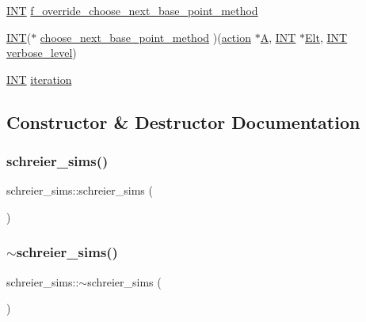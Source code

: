 \begin{DoxyCompactItemize}
\item 
\mbox{\hyperlink{galois_8h_a09fddde158a3a20bd2dcadb609de11dc}{I\+NT}} \mbox{\hyperlink{classschreier__sims_a0c07ea14a339d0349749522580786cc8}{f\+\_\+override\+\_\+choose\+\_\+next\+\_\+base\+\_\+point\+\_\+method}}
\item 
\mbox{\hyperlink{galois_8h_a09fddde158a3a20bd2dcadb609de11dc}{I\+NT}}($\ast$ \mbox{\hyperlink{classschreier__sims_a8639b48a416a69dc88c6a1d89aafdc26}{choose\+\_\+next\+\_\+base\+\_\+point\+\_\+method}} )(\mbox{\hyperlink{classaction}{action}} $\ast$\mbox{\hyperlink{simeon_8_c_a97833f04c3a9c008df5521a2fc291bb4}{A}}, \mbox{\hyperlink{galois_8h_a09fddde158a3a20bd2dcadb609de11dc}{I\+NT}} $\ast$\mbox{\hyperlink{simeon_8_c_aec1406935bdb1fee3561fcb840964100}{Elt}}, \mbox{\hyperlink{galois_8h_a09fddde158a3a20bd2dcadb609de11dc}{I\+NT}} \mbox{\hyperlink{simeon_8_c_a818073fbcc2f439e7c56952f67386122}{verbose\+\_\+level}})
\item 
\mbox{\hyperlink{galois_8h_a09fddde158a3a20bd2dcadb609de11dc}{I\+NT}} \mbox{\hyperlink{classschreier__sims_a11b719a35db207e78f21da7c98d67d18}{iteration}}
\end{DoxyCompactItemize}


\subsection{Constructor \& Destructor Documentation}
\mbox{\label{classschreier__sims_adf64ea1ff0b44a980b7fa5a3ddd9f2db}} 
\subsubsection{\texorpdfstring{schreier\+\_\+sims()}{schreier\_sims()}}
{\footnotesize\ttfamily schreier\+\_\+sims\+::schreier\+\_\+sims (\begin{DoxyParamCaption}{ }\end{DoxyParamCaption})}

\mbox{\label{classschreier__sims_a1b5c79f11ed6b9f0e7a7fe5f4d2f6baf}} 
\subsubsection{\texorpdfstring{$\sim$schreier\+\_\+sims()}{~schreier\_sims()}}
{\footnotesize\ttfamily schreier\+\_\+sims\+::$\sim$schreier\+\_\+sims (\begin{DoxyParamCaption}{ }\end{DoxyParamCaption})}



